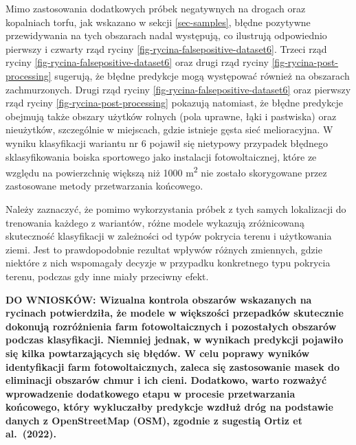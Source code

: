 \documentclass{amuthesis}
\begin{document}
Mimo zastosowania dodatkowych próbek negatywnych na drogach oraz
kopalniach torfu, jak wskazano w sekcji \ref{sec-samples}, błędne
pozytywne przewidywania na tych obszarach nadal występują, co ilustrują
odpowiednio pierwszy i czwarty rząd ryciny
\ref{fig-rycina-falsepositive-dataset6}. Trzeci rząd ryciny
\ref{fig-rycina-falsepositive-dataset6} oraz drugi rząd ryciny
\ref{fig-rycina-post-processing} sugerują, że błędne predykcje mogą
występować również na obszarach zachmurzonych. Drugi rząd ryciny
\ref{fig-rycina-falsepositive-dataset6} oraz pierwszy rząd ryciny
\ref{fig-rycina-post-processing} pokazują natomiast, że błędne predykcje
obejmują także obszary użytków rolnych (pola uprawne, łąki i pastwiska)
oraz nieużytków, szczególnie w miejscach, gdzie istnieje gęsta sieć
melioracyjna. W wyniku klasyfikacji wariantu nr 6 pojawił się nietypowy
przypadek błędnego sklasyfikowania boiska sportowego jako instalacji
fotowoltaicznej, które ze względu na powierzchnię większą niż 1000
m\textsuperscript{2} nie zostało skorygowane przez zastosowane metody
przetwarzania końcowego.

Należy zaznaczyć, że pomimo wykorzystania próbek z tych samych
lokalizacji do trenowania każdego z wariantów, różne modele wykazują
zróżnicowaną skuteczność klasyfikacji w zależności od typów pokrycia
terenu i użytkowania ziemi. Jest to prawdopodobnie rezultat wpływów
różnych zmiennych, gdzie niektóre z nich wspomagały decyzje w przypadku
konkretnego typu pokrycia terenu, podczas gdy inne miały przeciwny
efekt.

\textbf{DO WNIOSKÓW: Wizualna kontrola obszarów wskazanych na rycinach
potwierdziła, że modele w większości przepadków skutecznie dokonują
rozróżnienia farm fotowoltaicznych i pozostałych obszarów podczas
klasyfikacji. Niemniej jednak, w wynikach predykcji pojawiło się kilka
powtarzających się błędów. W celu poprawy wyników identyfikacji farm
fotowoltaicznych, zaleca się zastosowanie masek do eliminacji obszarów
chmur i ich cieni. Dodatkowo, warto rozważyć wprowadzenie dodatkowego
etapu w procesie przetwarzania końcowego, który wykluczałby predykcje
wzdłuż dróg na podstawie danych z OpenStreetMap (OSM), zgodnie z
sugestią Ortiz et al.~(2022).}
\end{document}
